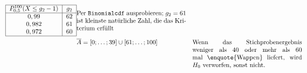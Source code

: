 \documentclass[10pt]{article}
\begin{document}
\begin{example}
\begin{align*}
\begin{tabular}{|c|c|}
	\hline
	$P^{100}_{0,5}(X \leq g_2 - 1)$ & $g_2$ \\ \hline
	$0,99$ & $62$ \\
	$0,982$ & $61$ \\
	$0,972$ & $60$ \\
	\hline
	\end{tabular} &\parbox{0.5\linewidth}{Per \texttt{Binomialcdf} ausprobieren; $g_2 = 61$ ist kleinste natürliche Zahl, die das Kriterium erfüllt}\\
&\overline A = [0;\dots;39] \cup [61;\dots;100] &\parbox[t]{0.5\linewidth}{Wenn das Stichprobenergebnis weniger als $40$ oder mehr als $60$ mal \enquote{Wappen} liefert, wird $H_0$ verworfen, sonst nicht.} \\
\end{align*}
\end{example}
\end{document}

